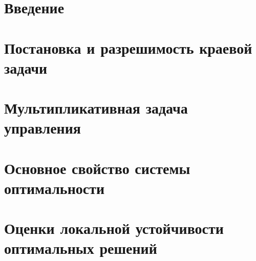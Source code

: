 \documentclass[14pt, a4paper, fleqn]{extarticle}
\begin{document}
	
	\setcounter{page}{-1}


	
	


	\section*{}
	
	\thispagestyle{empty}
	
	
	\maketoc


	\pagebreak

	\section{Введение}
	

	\pagebreak

	\section{Постановка и разрешимость краевой задачи}
	

	\pagebreak
	
	\section{Мультипликативная задача управления}
	

	\pagebreak
	
	\section{Основное свойство системы оптимальности}
	

	\pagebreak

	\section{Оценки локальной устойчивости оптимальных решений}
	
\end{document}

